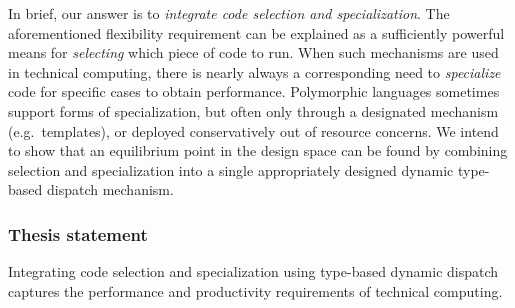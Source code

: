 In brief, our answer is to \emph{integrate code selection and specialization}.
The aforementioned flexibility requirement can be explained as
a sufficiently powerful means for \emph{selecting} which piece of code
to run.
When such mechanisms are used in technical computing, there is nearly
always a corresponding need to \emph{specialize} code for specific cases
to obtain performance.
Polymorphic languages sometimes support forms of specialization,
but often only through a designated mechanism (e.g.\ templates), or
deployed conservatively out of resource concerns.
We intend to show that an equilibrium point in the design space can be found
by combining selection and specialization into a single appropriately designed
dynamic type-based dispatch mechanism.

\subsubsection{Thesis statement}

Integrating code selection and specialization using
type-based dynamic dispatch captures the performance and
productivity requirements of technical computing.






